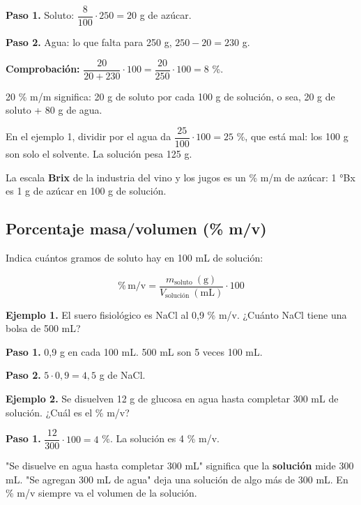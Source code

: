  

\textbf{Paso 1.} Soluto: $\dfrac{8}{100}\cdot 250 = 20$ g de azúcar.

 

\textbf{Paso 2.} Agua: lo que falta para 250 g, $250 - 20 = 230$ g.

 

\textbf{Comprobación:} $\dfrac{20}{20 + 230}\cdot 100 = \dfrac{20}{250}\cdot 100 = 8$ \%. 

  
\begin{clave} 20 \% m/m significa: 20 g de soluto por cada 100 g de solución, o sea, 20 g de soluto + 80 g de agua.\end{clave}
 
\begin{ojo} En el ejemplo 1, dividir por el agua da $\dfrac{25}{100}\cdot 100 = 25$ \%, que está mal: los 100 g son solo el solvente. La solución pesa 125 g.\end{ojo}
 
\begin{clave}[{}] La escala \textbf{Brix} de la industria del vino y los jugos es un \% m/m de azúcar: 1 °Bx es 1 g de azúcar en 100 g de solución.\end{clave}
\subsection{Porcentaje masa/volumen (\% m/v)}
Indica cuántos gramos de soluto hay en 100 mL de solución:

 \[ \%\,\text{m/v} = \dfrac{m_{\text{soluto}}\ (\text{g})}{V_{\text{solución}}\ (\text{mL})}\cdot 100 \] 

\textbf{Ejemplo 1.} El suero fisiológico es NaCl al 0,9 \% m/v. ¿Cuánto NaCl tiene una bolsa de 500 mL?

 

\textbf{Paso 1.} 0,9 g en cada 100 mL. 500 mL son 5 veces 100 mL.

 

\textbf{Paso 2.} $5 \cdot 0{,}9 = 4{,}5$ g de NaCl.

 

\textbf{Ejemplo 2.} Se disuelven 12 g de glucosa en agua hasta completar 300 mL de solución. ¿Cuál es el \% m/v?

 

\textbf{Paso 1.} $\dfrac{12}{300}\cdot 100 = 4$ \%. La solución es 4 \% m/v.

  
\begin{ojo} "Se disuelve en agua hasta completar 300 mL" significa que la \textbf{solución} mide 300 mL. "Se agregan 300 mL de agua" deja una solución de algo más de 300 mL. En \% m/v siempre va el volumen de la solución.\end{ojo}
 
